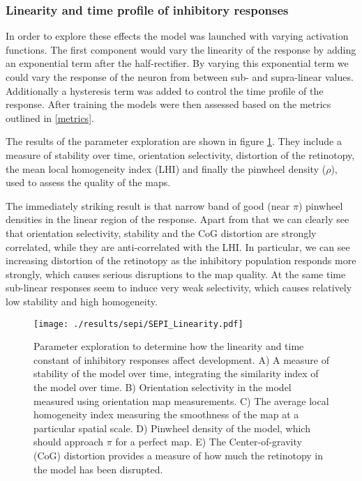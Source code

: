 \subsubsection{Linearity and time profile of inhibitory responses}

In order to explore these effects the model was launched with varying
activation functions. The first component would vary the linearity of
the response by adding an exponential term after the
half-rectifier. By varying this exponential term we could vary the
response of the neuron from between sub- and supra-linear
values. Additionally a hysteresis term was added to control the time
profile of the response. After training the models were then assessed
based on the metrics outlined in \ref{metrics}.

The results of the parameter exploration are shown in figure
\ref{SEPILinearity}. They include a measure of stability over time,
orientation selectivity, distortion of the retinotopy, the mean local
homogeneity index (LHI) and finally the pinwheel density ($\rho$),
used to assess the quality of the maps.

The immediately striking result is that narrow band of good (near
$\pi$) pinwheel densities in the linear region of the response. Apart
from that we can clearly see that orientation selectivity, stability
and the CoG distortion are strongly correlated, while they are
anti-correlated with the LHI. In particular, we can see increasing
distortion of the retinotopy as the inhibitory population responds
more strongly, which causes serious disruptions to the map quality. At
the same time sub-linear responses seem to induce very weak
selectivity, which causes relatively low stability and high
homogeneity.

\begin{figure}
	\centering
        \texttt{[image: ./results/sepi/SEPI\_Linearity.pdf]}
	\caption{Parameter exploration to determine how the linearity and
      time constant of inhibitory responses affect development. A) A
      measure of stability of the model over time, integrating the
      similarity index of the model over time. B) Orientation
      selectivity in the model measured using orientation map
      measurements. C) The average local homogeneity index measuring
      the smoothness of the map at a particular spatial scale. D)
      Pinwheel density of the model, which should approach $\pi$ for a
      perfect map. E) The Center-of-gravity (CoG) distortion provides
      a measure of how much the retinotopy in the model has been
      disrupted.}
	\label{SEPILinearity}
\end{figure}

